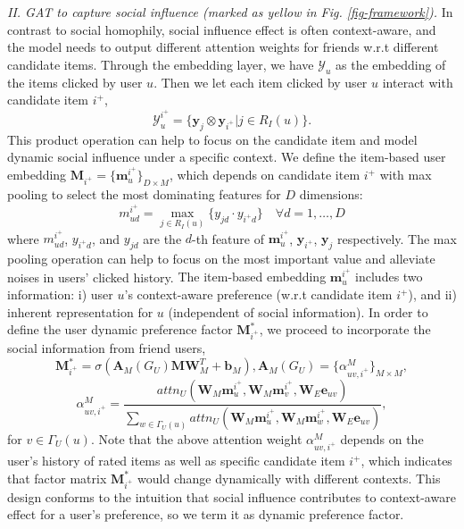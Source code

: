 \documentclass[sigconf]{acmart}
\begin{document}
\emph{II. GAT to capture social influence (marked as yellow in Fig. \ref{fig-framework}).} 
In contrast to social homophily, social influence effect is often context-aware, and the model needs to output different attention weights for friends w.r.t different candidate items. 
Through the embedding layer, we have $\mathcal Y_{u}$ as the embedding of {the items clicked by} user $u$.
Then we let each item clicked by user $u$ interact with candidate item $i^+$, 
\begin{equation}\nonumber
\mathcal Y^{i^+}_{u} = \{\mathbf y_j \otimes \mathbf y_{i^+}|j\in R_I(u)\}.
\end{equation}
This product operation can help to focus on the candidate item and model dynamic social influence under a specific context. 
{We define the item-based user embedding $\mathbf M_{i^+}=\{\mathbf m^{i^+}_u\}_{D\times M}$, which depends on candidate item $i^+$ with max pooling}
to select the most dominating features for $D$ dimensions:
\begin{equation}\nonumber
m^{i^+}_{ud} = \max\limits_{j\in R_I(u)}\{y_{jd} \cdot y_{{i^+}d} \} \quad \forall d=1,\ldots, D
\end{equation}
   {where} $m^{i^+}_{ud}$, $y_{{i^+}d}$, {and} $y_{jd}$ are the $d$-th feature of $\mathbf m^{i^+}_u$, $\mathbf y_{i^+}$, $\mathbf y_j$ respectively. 
The max pooling operation can help to focus on the most important value and alleviate noises in users' clicked history. {The item-based embedding $\mathbf m^{i^+}_u$ includes two information}: i) user $u$'s context-aware preference (w.r.t candidate item $i^+$), and ii) inherent representation for $u$ (independent of social information). 
{In order to define the user dynamic preference factor $\mathbf M_{i^+}^*$,}
we proceed to incorporate the social information from friend users,
\begin{equation}\nonumber
\mathbf M_{i^+}^* = \sigma(\mathbf A_M(G_U)\mathbf M\mathbf W_M^T+\mathbf b_M),\mathbf A_M(G_U) = \{\alpha^M_{uv,{i^+}}\}_{M\times M},
\end{equation}
\begin{equation}\nonumber
\alpha^M_{uv,{i^+}} = \frac{ attn_U(\mathbf W_M \mathbf m^{i^+}_u, \mathbf W_M \mathbf m^{i^+}_v, \mathbf W_E\mathbf e_{uv})}{\sum_{w\in  \Gamma_U(u)}attn_U(\mathbf W_M \mathbf m^{i^+}_u, \mathbf W_M \mathbf m^{i^+}_w, \mathbf W_E\mathbf e_{uv})},
\end{equation}
for $v\in \Gamma_U(u)$.
Note that the above attention weight $\alpha^M_{uv,i^+}$ depends on the user's history of rated items as well as specific candidate item $i^+$, which indicates that factor matrix $\mathbf M_{i^+}^*$ would change dynamically with  different contexts. This design conforms to the intuition that social influence contributes to context-aware effect for a user's preference, so we term it as dynamic preference factor.
\end{document}
